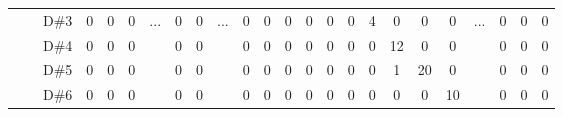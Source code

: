 \documentclass[12pt]{article}
\begin{document}
\begin{table}[!ht]
{\begin{tabular}{clcccccccccccccccccccccc}
								   & \multicolumn{1}{l|}{}                   & \multicolumn{1}{c|}{D\#3} & \multicolumn{1}{c|}{0}    & \multicolumn{1}{c|}{0}    & \multicolumn{1}{c|}{0}    & \multicolumn{1}{c|}{\multirow{4}{*}{...}} & \multicolumn{1}{c|}{0}    & \multicolumn{1}{c|}{0}  & \multicolumn{1}{c|}{\multirow{4}{*}{...}} & \multicolumn{1}{c|}{0}  & \multicolumn{1}{c|}{0}  & \multicolumn{1}{c|}{0}  & \multicolumn{1}{c|}{0}  & \multicolumn{1}{c|}{0}    & \multicolumn{1}{c|}{0}    & \multicolumn{1}{c|}{4}    & \multicolumn{1}{c|}{0}    & \multicolumn{1}{c|}{0}    & \multicolumn{1}{c|}{0}    & \multicolumn{1}{c|}{\multirow{4}{*}{...}} & \multicolumn{1}{c|}{0}  & \multicolumn{1}{c|}{0}  & \multicolumn{1}{c|}{0}  \\ \cline{3-6} \cline{8-9} \cline{11-20} \cline{22-24} 
								   & \multicolumn{1}{l|}{}                   & \multicolumn{1}{c|}{D\#4} & \multicolumn{1}{c|}{0}    & \multicolumn{1}{c|}{0}    & \multicolumn{1}{c|}{0}    & \multicolumn{1}{c|}{}                     & \multicolumn{1}{c|}{0}    & \multicolumn{1}{c|}{0}  & \multicolumn{1}{c|}{}                     & \multicolumn{1}{c|}{0}  & \multicolumn{1}{c|}{0}  & \multicolumn{1}{c|}{0}  & \multicolumn{1}{c|}{0}  & \multicolumn{1}{c|}{0}    & \multicolumn{1}{c|}{0}    & \multicolumn{1}{c|}{0}    & \multicolumn{1}{c|}{12}   & \multicolumn{1}{c|}{0}    & \multicolumn{1}{c|}{0}    & \multicolumn{1}{c|}{}                     & \multicolumn{1}{c|}{0}  & \multicolumn{1}{c|}{0}  & \multicolumn{1}{c|}{0}  \\ \cline{3-6} \cline{8-9} \cline{11-20} \cline{22-24} 
								   & \multicolumn{1}{l|}{}                   & \multicolumn{1}{c|}{D\#5} & \multicolumn{1}{c|}{0}    & \multicolumn{1}{c|}{0}    & \multicolumn{1}{c|}{0}    & \multicolumn{1}{c|}{}                     & \multicolumn{1}{c|}{0}    & \multicolumn{1}{c|}{0}  & \multicolumn{1}{c|}{}                     & \multicolumn{1}{c|}{0}  & \multicolumn{1}{c|}{0}  & \multicolumn{1}{c|}{0}  & \multicolumn{1}{c|}{0}  & \multicolumn{1}{c|}{0}    & \multicolumn{1}{c|}{0}    & \multicolumn{1}{c|}{0}    & \multicolumn{1}{c|}{1}    & \multicolumn{1}{c|}{20}   & \multicolumn{1}{c|}{0}    & \multicolumn{1}{c|}{}                     & \multicolumn{1}{c|}{0}  & \multicolumn{1}{c|}{0}  & \multicolumn{1}{c|}{0}  \\ \cline{3-6} \cline{8-9} \cline{11-20} \cline{22-24} 
								   & \multicolumn{1}{l|}{}                   & \multicolumn{1}{c|}{D\#6} & \multicolumn{1}{c|}{0}    & \multicolumn{1}{c|}{0}    & \multicolumn{1}{c|}{0}    & \multicolumn{1}{c|}{}                     & \multicolumn{1}{c|}{0}    & \multicolumn{1}{c|}{0}  & \multicolumn{1}{c|}{}                     & \multicolumn{1}{c|}{0}  & \multicolumn{1}{c|}{0}  & \multicolumn{1}{c|}{0}  & \multicolumn{1}{c|}{0}  & \multicolumn{1}{c|}{0}    & \multicolumn{1}{c|}{0}    & \multicolumn{1}{c|}{0}    & \multicolumn{1}{c|}{0}    & \multicolumn{1}{c|}{0}    & \multicolumn{1}{c|}{10}   & \multicolumn{1}{c|}{}                     & \multicolumn{1}{c|}{0}  & \multicolumn{1}{c|}{0}  & \multicolumn{1}{c|}{0}  \\ \cline{3-6} \cline{8-9} \cline{11-20} \cline{22-24} 

\end{tabular}}
\end{table}
\end{document}
